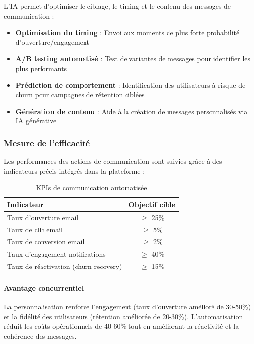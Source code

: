 L'IA permet d'optimiser le ciblage, le timing et le contenu des messages de communication :

\begin{itemize}
    \item \textbf{Optimisation du timing} : Envoi aux moments de plus forte probabilité d'ouverture/engagement
    \item \textbf{A/B testing automatisé} : Test de variantes de messages pour identifier les plus performants
    \item \textbf{Prédiction de comportement} : Identification des utilisateurs à risque de churn pour campagnes de rétention ciblées
    \item \textbf{Génération de contenu} : Aide à la création de messages personnalisés via IA générative
\end{itemize}

\subsubsection{Mesure de l'efficacité}

Les performances des actions de communication sont suivies grâce à des indicateurs précis intégrés dans la plateforme :

\begin{table}[H]
\centering
\caption{KPIs de communication automatisée}
\label{tab:kpis-communication}
\begin{tabular}{|l|c|}
\hline
\textbf{Indicateur} & \textbf{Objectif cible} \\
\hline
Taux d'ouverture email & $\geq$ 25\% \\
\hline
Taux de clic email & $\geq$ 5\% \\
\hline
Taux de conversion email & $\geq$ 2\% \\
\hline
Taux d'engagement notifications & $\geq$ 40\% \\
\hline
Taux de réactivation (churn recovery) & $\geq$ 15\% \\
\hline
\end{tabular}
\end{table}

\paragraph{Avantage concurrentiel}

La personnalisation renforce l'engagement (taux d'ouverture amélioré de 30-50\%) et la fidélité des utilisateurs (rétention améliorée de 20-30\%). L'automatisation réduit les coûts opérationnels de 40-60\% tout en améliorant la réactivité et la cohérence des messages.

